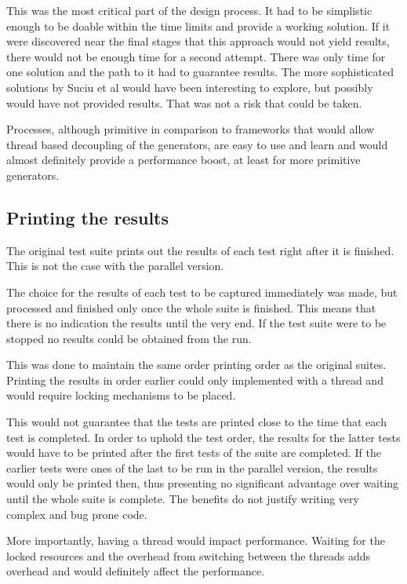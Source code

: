 This was the most critical part of the design process. It had to be simplistic enough to be doable within the time limits and provide a working solution. If it were discovered near the final stages that this approach would not yield results, there would not be enough time for a second attempt. There was only time for one solution and the path to it had to guarantee results. The more sophisticated solutions by Suciu et al\cite{parallelism-paper2} would have been interesting to explore, but possibly would have not provided results. That was not a risk that could be taken.

Processes, although primitive in comparison to frameworks that would allow thread based decoupling of the generators, are easy to use and learn and would almost definitely provide a performance boost, at least for more primitive generators.

\subsection{Printing the results}
The original test suite prints out the results of each test right after it is finished. This is not the case with the parallel version.

The choice for the results of each test to be captured immediately was made, but processed and finished only once the whole suite is finished. This means that there is no indication the results until the very end. If the test suite were to be stopped no results could be obtained from the run.

This was done to maintain the same order printing order as the original suites. Printing the results in order earlier could only implemented with a thread and would require locking mechanisms to be placed.

This would not guarantee that the tests are printed close to the time that each test is completed. In order to uphold the test order, the results for the latter tests would have to be printed after the first tests of the suite are completed. If the earlier tests were ones of the last to be run in the parallel version, the results would only be printed then, thus presenting no significant advantage over waiting until the whole suite is complete. The benefits do not justify writing very complex and bug prone code.

More importantly, having a thread would impact performance. Waiting for the locked resources and the overhead from switching between the threads adds overhead and would definitely affect the performance.

